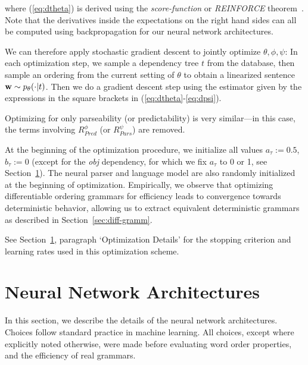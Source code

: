 \documentclass[10pt,twoside,lineno]{article}
\begin{document}
where (\ref{eq:dtheta}) is derived using the \emph{score-function} or \emph{REINFORCE} theorem~\cite{williams1992simple}.
Note that the derivatives inside the expectations on the right hand sides can all be computed using backpropagation for our neural network architectures.

We can therefore apply stochastic gradient descent to jointly optimize $\theta, \phi, \psi$:
In each optimization step, we sample a dependency tree $t$ from the database, then sample an ordering from the current setting of $\theta$ to obtain a linearized sentence ${\bf w} \sim p_{\theta}(\cdot|t)$.
Then we %
do a gradient descent step using the estimator given by the expressions in the square brackets in (\ref{eq:dtheta}-\ref{eq:dpsi}).


Optimizing for only parseability (or predictability) is very similar---in this case, the terms involving $R_{Pred}^\phi$ (or $R_{Pars}^\psi$) are removed.


At the beginning of the optimization procedure, we initialize all values $a_\tau := 0.5$, $b_\tau := 0$ (except for the \emph{obj} dependency, for which we fix $a_\tau$ to 0 or 1, see Section~\ref{sec:neural-architectures}).
The neural parser and language model are also randomly initialized at the beginning of optimization.
Empirically, we observe that optimizing differentiable ordering grammars for efficiency leads to convergence towards deterministic behavior, allowing us to extract equivalent deterministic grammars as described in Section~\ref{sec:diff-gramm}.

See Section~\ref{sec:neural-architectures}, paragraph `Optimization Details' for the stopping criterion and learning rates used in this optimization scheme.



\section{Neural Network Architectures}\label{sec:neural-architectures}

In this section, we describe the details of the neural network architectures.
Choices follow standard practice in machine learning.
All choices, except where explicitly noted otherwise, were made before evaluating word order properties, and the efficiency of real grammars.
\end{document}
